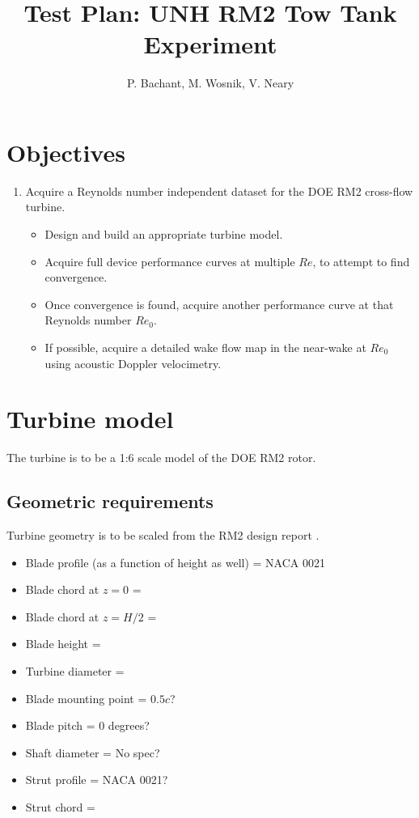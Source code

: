 \documentclass[10pt,a4paper]{article}
\author{P. Bachant, M. Wosnik, V. Neary}
\title{Test Plan: UNH RM2 Tow Tank Experiment}
\begin{document}
\maketitle
\tableofcontents

\section{Objectives}

\begin{enumerate}

	\item Acquire a Reynolds number independent dataset for the DOE RM2 cross-flow
	turbine.

		\begin{itemize}
			\item Design and build an appropriate turbine model.
		
			\item Acquire full device performance curves at multiple $Re$, to attempt to
			find convergence.
		  
			\item Once convergence is found, acquire another performance curve at that
			Reynolds number $Re_0$.
		
			\item If possible, acquire a detailed wake flow map in the near-wake at
			$Re_0$ using acoustic Doppler velocimetry.
		\end{itemize}

\end{enumerate}


\section{Turbine model}

The turbine is to be a 1:6 scale model of the DOE RM2 rotor.

\subsection{Geometric requirements}

Turbine geometry is to be scaled from the RM2 design report \cite{Barone2011}.

\begin{itemize}
	\item Blade profile (as a function of height as well) = NACA 0021
	\item
	  {Blade chord at $z=0$ = }
	\item
	  {Blade chord at $z = H/2$ = }
	\item
	  {Blade height = }
	\item
	  {Turbine diameter = }
	\item
	  {Blade mounting point = $0.5c$?}
	\item
	  {Blade pitch = 0 degrees?}
	\item
	  {Shaft diameter = No spec?}
	\item
	  {Strut profile = NACA 0021?}
	\item
	  {Strut chord = }
\end{itemize}



\end{document}
